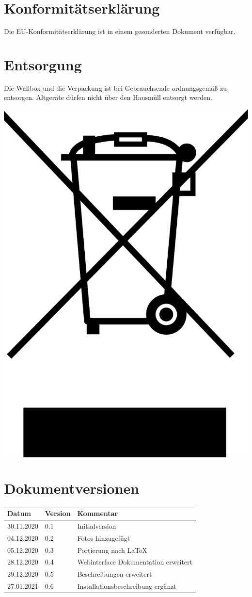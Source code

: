 \documentclass[a4paper,10pt]{article}
\begin{document}
\begin{multicols*}{2}
	\section{Konformitätserklärung}
	Die EU-Konformitätserklärung ist in einem gesonderten Dokument verfügbar.

	\section{Entsorgung}
	Die Wallbox und die Verpackung ist bei Gebrauchsende ordnungsgemäß zu
	entsorgen. Altgeräte dürfen nicht über den Hausmüll entsorgt werden.

	\includegraphics[width=0.2\linewidth]{./img/resized/weee.pdf}

	\section{Dokumentversionen}
	\begin{tabular}{lll}
		\toprule
		Datum      & Version & Kommentar              \\
		\midrule
		30.11.2020 & 0.1     & Initialversion         \\
		04.12.2020 & 0.2     & Fotos hinzugefügt      \\
		05.12.2020 & 0.3     & Portierung nach \LaTeX \\
		28.12.2020 & 0.4     & Webinterface Dokumentation erweitert \\
		29.12.2020 & 0.5     & Beschreibungen erweitert \\
		27.01.2021 & 0.6     & Installationsbeschreibung ergänzt \\
		\bottomrule
	\end{tabular}

\end{multicols*}

\end{document}
